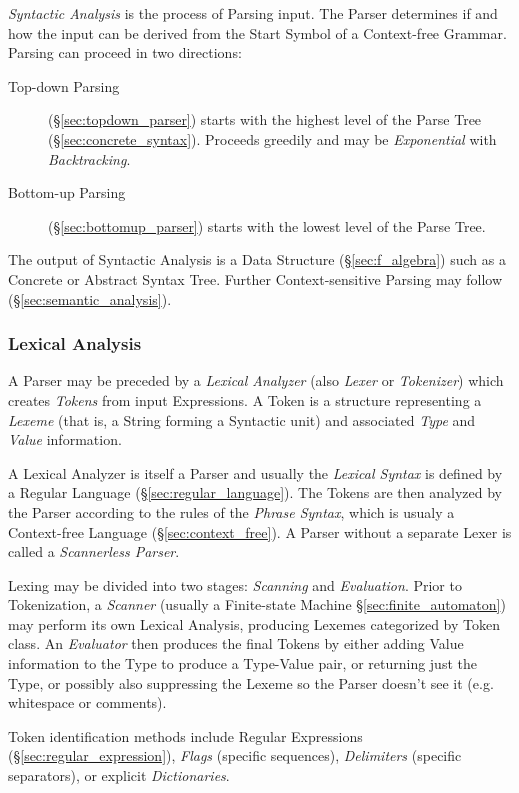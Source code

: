 \emph{Syntactic Analysis} is the process of Parsing input. The Parser
determines if and how the input can be derived from the Start Symbol
of a Context-free Grammar. Parsing can proceed in two directions:
\begin{description}
\item [Top-down Parsing] (\S\ref{sec:topdown_parser}) starts with
  the highest level of the Parse Tree (\S\ref{sec:concrete_syntax}).
  Proceeds greedily and may be \emph{Exponential} with
  \emph{Backtracking}.
\item [Bottom-up Parsing] (\S\ref{sec:bottomup_parser}) starts with
  the lowest level of the Parse Tree.
\end{description}
The output of Syntactic Analysis is a Data Structure
(\S\ref{sec:f_algebra}) such as a Concrete or Abstract Syntax Tree.
Further Context-sensitive Parsing may follow
(\S\ref{sec:semantic_analysis}).



\subsubsection{Lexical Analysis}\label{sec:lexical_analysis}

A Parser may be preceded by a \emph{Lexical Analyzer} (also
\emph{Lexer} or \emph{Tokenizer}) which creates \emph{Tokens} from
input Expressions. A Token is a structure representing a \emph{Lexeme}
(that is, a String forming a Syntactic unit) and associated
\emph{Type} and \emph{Value} information.

A Lexical Analyzer is itself a Parser and usually the \emph{Lexical
  Syntax} is defined by a Regular Language
(\S\ref{sec:regular_language}). The Tokens are then analyzed by the
Parser according to the rules of the \emph{Phrase Syntax}, which is
usualy a Context-free Language (\S\ref{sec:context_free}). A Parser
without a separate Lexer is called a \emph{Scannerless Parser}.

Lexing may be divided into two stages: \emph{Scanning} and
\emph{Evaluation}. Prior to Tokenization, a \emph{Scanner} (usually a
Finite-state Machine \S\ref{sec:finite_automaton}) may perform its own
Lexical Analysis, producing Lexemes categorized by Token class. An
\emph{Evaluator} then produces the final Tokens by either adding Value
information to the Type to produce a Type-Value pair, or returning
just the Type, or possibly also suppressing the Lexeme so the Parser
doesn't see it (e.g. whitespace or comments).

Token identification methods include Regular Expressions
(\S\ref{sec:regular_expression}), \emph{Flags} (specific sequences),
\emph{Delimiters} (specific separators), or explicit
\emph{Dictionaries}.



